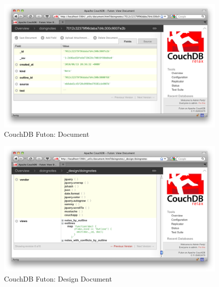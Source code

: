 \begin{figure}[H] 
  \begin{center}
    \includegraphics[width=\textwidth]{grafik/futon-document} 
  \end{center}
  \caption{CouchDB Futon: Document}
  \label{fig:futon-document} 
\end{figure}

\medskip
\begin{figure}[H] 
  \begin{center}
    \includegraphics[width=\textwidth]{grafik/futon-design-document} 
  \end{center}
  \caption{CouchDB Futon: Design Document}
  \label{fig:futon-design} 
\end{figure}
